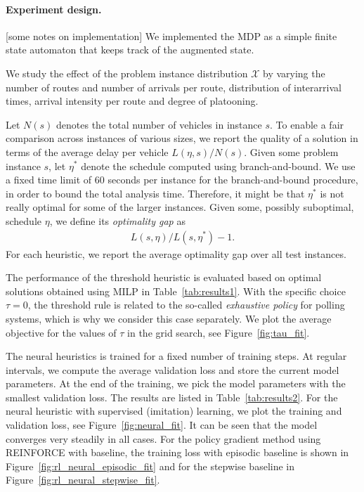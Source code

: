 \documentclass[a4paper]{report}
\theoremstyle{definition}
\theoremstyle{plain}
\newcommand\note[1]{{\color{Navy}#1}}
\begin{document}
\paragraph{Experiment design.}

\note{[some notes on implementation] We implemented the MDP as a simple finite state automaton that keeps track of
the augmented state.}

We study the effect of the problem instance distribution $\mathcal{X}$ by
varying the number of routes and number of arrivals per route, distribution of
interarrival times, arrival intensity per route and degree of platooning.

Let $N(s)$ denotes the total number of vehicles in instance $s$. To enable a
fair comparison across instances of various sizes, we report the quality of a
solution in terms of the average delay per vehicle $L(\eta, s) / N(s)$.
%
Given some problem instance $s$, let $\eta^{*}$ denote the schedule computed using
branch-and-bound. We use a fixed time limit of 60 seconds per instance for the
branch-and-bound procedure, in order to bound the total analysis time.
Therefore, it might be that $\eta^{*}$ is not really optimal for some of the larger
instances. Given some, possibly suboptimal, schedule $\eta$, we define its \textit{optimality gap}
as
\begin{align*}
  L(s, \eta) / L(s, \eta^{*}) - 1 .
\end{align*}
For each heuristic, we report the average optimality gap over all test
instances.

The performance of the threshold heuristic is evaluated based on optimal
solutions obtained using MILP in Table~\ref{tab:results1}.
%
With the specific choice $\tau = 0$, the threshold rule is related to the
so-called \textit{exhaustive policy} for polling systems, which is why we
consider this case separately. We plot the average objective for the values of
$\tau$ in the grid search, see Figure~\ref{fig:tau_fit}.

The neural heuristics is trained for a fixed number of training steps. At
regular intervals, we compute the average validation loss and store the current
model parameters. At the end of the training, we pick the model parameters with
the smallest validation loss. The results are listed in Table~\ref{tab:results2}.
%
For the neural heuristic with supervised (imitation) learning, we plot the
training and validation loss, see Figure~\ref{fig:neural_fit}. It can be seen that the model
converges very steadily in all cases.
%
For the policy gradient method using REINFORCE with baseline, the training loss
with episodic baseline is shown in Figure~\ref{fig:rl_neural_episodic_fit} and
for the stepwise baseline in Figure~\ref{fig:rl_neural_stepwise_fit}.
\end{document}
